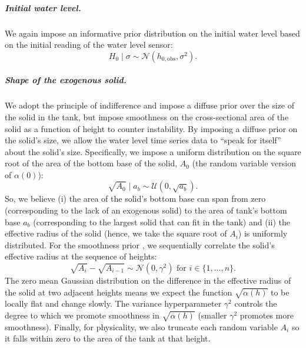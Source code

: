 \documentclass[a4paper,fleqn]{cas-dc}
\begin{document}
\subparagraph{Initial water level.} We again impose an informative prior distribution on the initial water level based on the initial reading of the water level sensor:
\begin{equation}
	H_0 \mid \sigma \sim \mathcal{N}(h_{0, \text{obs}}, \sigma^2).
\end{equation}

\subparagraph{Shape of the exogenous solid.}
We adopt the principle of indifference and impose a diffuse prior over the size of the solid in the tank, but impose smoothness on the cross-sectional area of the solid as a function of height to counter instability\cite{groetsch1993inverse_tl}. 
By imposing a diffuse prior on the solid's size, we allow the water level time series data to ``speak for itself'' about the solid's size.
Specifically, we impose a uniform distribution on the square root of the area of the bottom base of the solid, $A_0$ (the random variable version of $\alpha(0)$):
\begin{equation}
	\sqrt{A_0} \mid a_b \sim \mathcal{U}(0, \sqrt{a_b}).
\end{equation}
So, we believe 
(i) the area of the solid's bottom base can span from zero (corresponding to the lack of an exogenous solid) to the area of tank's bottom base $a_b$ (corresponding to the largest solid that can fit in the tank) and
(ii) the effective radius of the solid (hence, we take the square root of $A_i$) is uniformly distributed.
For the smoothness prior \cite{calvetti2018inverse}, we sequentially correlate the solid's effective radius at the sequence of heights: 
\begin{equation}
 \sqrt{A_i} - \sqrt{A_{i-1}} \sim \mathcal{N}(0, \gamma^2) \text{ for } i \in \{1, ..., n\}.
\end{equation} 
The zero mean Gaussian distribution on the difference in the effective radius of the solid at two adjacent heights means we expect the function $\sqrt{\alpha(h)}$ to be locally flat and change slowly. 
The variance hyperparameter $\gamma^2$ controls the degree to which we promote smoothness in $\sqrt{\alpha (h)}$ (smaller $\gamma^2$ promotes more smoothness). 
Finally, for physicality, we also truncate each random variable $A_i$ so it falls within zero to the area of the tank at that height.



\end{document}
